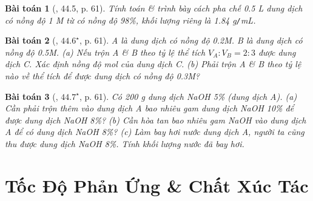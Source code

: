 \documentclass{article}
\newtheorem{baitoan}{Bài toán}
\begin{document}
\begin{baitoan}[\cite{SBT_Hoa_Hoc_8}, 44.5, p. 61]
	Tính toán \& trình bày cách pha chế \emph{0.5 L} dung dịch \emph{} có nồng độ \emph{1 M} từ \emph{} có nồng độ \emph{98\%}, khối lượng riêng là \emph{1.84 g\texttt{/}mL}.
\end{baitoan}

\begin{baitoan}[\cite{SBT_Hoa_Hoc_8}, $44.6^\star$, p. 61]
	A là dung dịch \emph{} có nồng độ \emph{0.2M}. B là dung dịch \emph{} có nồng độ \emph{0.5M}. (a) Nếu trộn A \& B theo tỷ lệ thể tích $V_A:V_B = 2:3$ được dung dịch C. Xác định nồng độ mol của dung dịch C. (b) Phải trộn A \& B theo tỷ lệ nào về thể tích để được dung dịch \emph{} có nồng độ \emph{0.3M}?
\end{baitoan}

\begin{baitoan}[\cite{SBT_Hoa_Hoc_8}, $44.7^\star$, p. 61]
	Có \emph{200 g} dung dịch \emph{NaOH 5\%} (dung dịch A). (a) Cần phải trộn thêm vào dung dịch A bao nhiêu gam dung dịch \emph{NaOH 10\%} để được dung dịch \emph{NaOH 8\%}? (b) Cần hòa tan bao nhiêu gam \emph{NaOH} vào dung dịch A để có dung dịch \emph{NaOH 8\%}? (c) Làm bay hơi nước dung dịch A, người ta cũng thu được dung dịch \emph{NaOH 8\%}. Tính khối lượng nước đã bay hơi.
\end{baitoan}


\section{Tốc Độ Phản Ứng \& Chất Xúc Tác}

\noindent{}


\printbibliography[heading=bibintoc]
	
\end{document}

